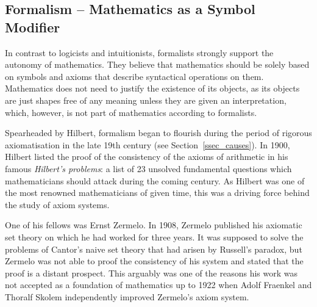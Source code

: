 \documentclass{article}
\begin{document}
\subsection{Formalism -- Mathematics as a Symbol Modifier}\label{ssec_formalism}
In contrast to logicists and intuitionists, formalists strongly support the autonomy of mathematics. 
They believe that mathematics should be solely based on symbols and axioms that describe syntactical operations on them. Mathematics does not need to justify the existence of its objects, as its objects are just shapes free of any meaning unless they are given an interpretation, which, however, is not part of mathematics according to formalists.

Spearheaded by Hilbert, formalism began to flourish during the period of rigorous axiomatisation in the late 19th century (see Section~\ref{ssec_causes}). 
In 1900, Hilbert listed the proof of the consistency of the axioms of arithmetic in his famous \textit{Hilbert's problems}: a list of 23 unsolved fundamental questions which mathematicians should attack during the coming century. As Hilbert was one of the most renowned mathematicians of given time, this was a driving force behind the study of axiom systems.

One of his fellows was Ernst Zermelo. In 1908, Zermelo published his axiomatic set theory on which he had worked for three years. It was supposed to solve the problems of Cantor's naive set theory that had arisen by Russell's paradox, but Zermelo was not able to proof the consistency of his system and stated that the proof is a distant prospect. This arguably was one of the reasons his work was not accepted as a foundation of mathematics up to 1922 when Adolf Fraenkel and Thoralf Skolem independently improved Zermelo's axiom system. 
\end{document}
